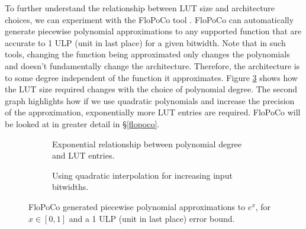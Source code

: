 \documentclass{fac}
\begin{document}
To further understand the relationship between LUT size and architecture choices, we can experiment with the FloPoCo tool \cite{DinechinPasca2011-DaT}. FloPoCo can automatically generate piecewise polynomial approximations to any supported function that are accurate to 1 ULP (unit in last place) for a given bitwidth. Note that in such tools, changing the function being approximated only changes the polynomials and doesn't fundamentally change the architecture. Therefore, the architecture is to some degree independent of the function it approximates. Figure \ref{fig:flopo_graph} shows how the LUT size required changes with the choice of polynomial degree. The second graph highlights how if we use quadratic polynomials and increase the precision of the approximation, exponentially more LUT entries are required. FloPoCo will be looked at in greater detail in \S \ref{flopoco}.

\begin{figure}
\centering
\begin{subfigure}{.45\textwidth}
  \centering
  \caption{Exponential relationship between polynomial degree and LUT entries.}
  \label{poly_deg_vs_lut}
\end{subfigure}\hspace{1em}%
\begin{subfigure}{.45\textwidth}
  \centering
  
  \caption{Using quadratic interpolation for increasing input bitwidths.}
  \label{input_width_vs_lut}
\end{subfigure}
\caption{FloPoCo \cite{DinechinPasca2011-DaT} generated piecewise polynomial approximations to $e^{x}$, for $x \in [0,1]$ and a 1 ULP (unit in last place) error bound.}
\label{fig:flopo_graph}
\end{figure}
\end{document}
